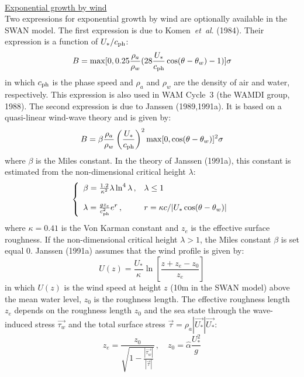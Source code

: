 \documentclass[12pt]{book}
\begin{document}
\\[2ex]
\noindent
\underline{Exponential growth by wind}\\[2ex]
Two expressions for exponential growth by wind are optionally available in the SWAN model. The first
expression is due to Komen~{\it et~al}. (1984). Their expression is a function of $U_{*}/c_{\rm ph}$:
\begin{equation}
  B = \max [0, 0.25 \frac{\rho_a}{\rho_w} (28 \frac{U_*}{c_{\rm ph}}\cos(\theta-\theta_w) -1)]\sigma
  \label{eq3-5}
\end{equation}
in which $c _{\rm ph}$ is the phase speed and $\rho_a$ and $\rho_w$ are the density of air and water, respectively. This
expression is also used in WAM Cycle~3 (the WAMDI group, 1988). The second expression is due to Janssen (1989,1991a).
It is based on a quasi-linear wind-wave theory and is given by:
\begin{equation}
  B = \beta \frac{\rho_a}{\rho_w} \left(\frac{U_*}{c_{\rm ph}} \right)^2 \max[0,\cos(\theta-\theta_w)]^2\sigma
  \label{eq3-6}
\end{equation}
where $\beta$ is the Miles constant. In the theory of Janssen (1991a), this constant is estimated from
the non-dimensional critical height $\lambda$:
\begin{equation}
    \left\{
      \begin{array}{ll}
         \beta = \frac{1.2}{\kappa^2} \lambda \ln^4 \lambda \, , & \lambda \leq 1\\
         \\
         \lambda = \frac{g z_e}{c^2_{\rm ph}} e^r \, , & r = \kappa c/|U_* \cos(\theta-\theta_w)|
      \end{array}
    \right.
  \label{eq3-7}
\end{equation}
where $\kappa=0.41$ is the Von Karman constant and $z_e$ is the effective surface roughness.
If the non-dimensional critical height $\lambda>1$, the Miles constant $\beta$ is set equal 0.
Janssen (1991a) assumes that the wind profile is given by:
\begin{equation}
  U(z) = \frac{U_*}{\kappa} \ln [ \frac{z+z_e-z_0}{z_e} ]
  \label{eq3-8}
\end{equation}
in which $U(z)$ is the wind speed at height $z$ (10m in the SWAN model) above the mean water level, $z_0$ is
the roughness length. The effective roughness length $z_e$ depends on the roughness length $z_0$ and the sea
state through the wave-induced stress $\vec{\tau_w}$ and the total surface stress $\vec{\tau} = \rho_a |\vec{U_*}| \vec{U_*}$:
\begin{equation}
  z_e = \frac{z_0}{\sqrt{1 - \frac{|\vec{\tau_w}|}{|\vec{\tau}|}}}\, , \quad z_0 = \hat{\alpha} \frac{U_*^2}{g}
  \label{eq3-9}
\end{equation}
\end{document}
